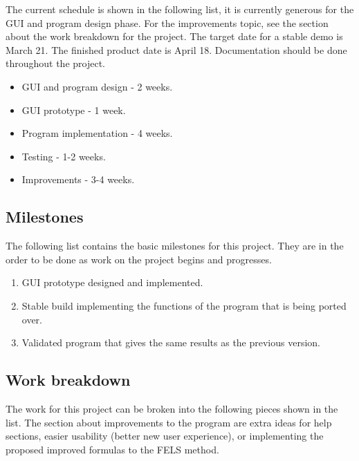 \documentclass[12pt,letterpaper]{article}
\begin{document}
The current schedule is shown in the following list, it is currently generous for the GUI and program design phase. For the improvements topic, see the section about the work breakdown for the project. The target date for a stable demo is March 21. The finished product date is April 18. Documentation should be done throughout the project.

\begin{itemize}

\item GUI and program design - 2 weeks.
\item GUI prototype - 1 week.
\item Program implementation - 4 weeks.
\item Testing - 1-2 weeks.
\item Improvements - 3-4 weeks.

\end{itemize}

\subsection{Milestones}

The following list contains the basic milestones for this project. They are in the order to be done as work on the project begins and progresses.

\begin{enumerate}

\item GUI prototype designed and implemented.
\item Stable build implementing the functions of the program that is being ported over.
\item Validated program that gives the same results as the previous version.

\end{enumerate}

\subsection{Work breakdown}

The work for this project can be broken into the following pieces shown in the list. The section about improvements to the program are extra ideas for help sections, easier usability (better new user experience), or implementing the proposed improved formulas to the FELS method.
\end{document}

